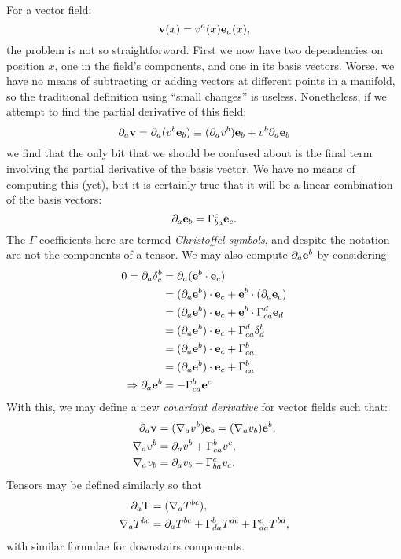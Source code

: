 For a vector field:
\begin{equation}
 \mathbf{v}(x) = v^a(x)\mathbf{e}_a(x),
  \label{eqn:dg:vector_field}
\end{equation}
the problem is not so straightforward. First we now have two dependencies on position $x$, one in the field's components, and one in its basis vectors. Worse, we have no means of subtracting or adding vectors at different points in a manifold, so the traditional definition using ``small changes'' is useless. Nonetheless, if we attempt to find the partial derivative of this field:
\begin{equation}
  \partial_a\mathbf{v} = \partial_a(v^b\mathbf{e}_b) \equiv (\partial_a v^b) \mathbf{e}_b + v^b \partial_a\mathbf{e}_b
  \label{eqn:dg:partial_expand}
\end{equation}
we find that the only bit that we should be confused about is the final term involving the partial derivative of the basis vector. We have no means of computing this (yet), but it is certainly true that it will be a linear combination of the basis vectors:
\begin{equation}
  \partial_a\mathbf{e}_b = \Gamma^c_{ba} \mathbf{e}_c.
  \label{eqn:dg:gamma_def}
\end{equation}
The $\Gamma$ coefficients here are termed {\em Christoffel symbols}, and despite the notation are not the components of a tensor. We may also compute $\partial_a \mathbf{e}^b$ by considering:
\begin{align}
  0 = \partial_a \delta^b_c &= \partial_a (\mathbf{e}^b\cdot\mathbf{e}_c)  
  \nonumber\\
  &= (\partial_a\mathbf{e}^b)\cdot\mathbf{e}_c + \mathbf{e}^b\cdot(\partial_a\mathbf{e}_c)
  \nonumber \\
  &= (\partial_a\mathbf{e}^b)\cdot\mathbf{e}_c + \mathbf{e}^b\cdot\Gamma^d_{ca} \mathbf{e}_d 
  \nonumber \\
  &= (\partial_a\mathbf{e}^b)\cdot\mathbf{e}_c + \Gamma^d_{ca} \delta^b_d
  \nonumber \\
  &= (\partial_a\mathbf{e}^b)\cdot\mathbf{e}_c + \Gamma^b_{ca} 
  \nonumber \\
  &= (\partial_a\mathbf{e}^b)\cdot\mathbf{e}_c + \Gamma^b_{ca} 
  \nonumber \\
  \Rightarrow \partial_a\mathbf{e}^b
  &=  - \Gamma^b_{ca} \mathbf{e}^c
  \label{eqn:dg:chris_deriv}
\end{align}
With this, we may define a new {\em covariant derivative\/} for vector fields such that:
\begin{align}
  \partial_a\mathbf{v} &= (\nabla_a v^b) \mathbf{e}_b = (\nabla_a v_b) \mathbf{e}^b,
  \\
   \nabla_a v^b &= \partial_a v^b + \Gamma^b_{ca}v^c,
   \\
   \nabla_a v_b &= \partial_a v_b - \Gamma^c_{ba}v_c.
\end{align}
Tensors may be defined similarly so that
\begin{align}
  \partial_a \mathrm{T} &= (\nabla_a T^{bc}),
  \\
  \nabla_a T^{bc} &= \partial_a T^{bc} + \Gamma^b_{da}T^{dc} + \Gamma^c_{da}T^{bd},
\end{align}
with similar formulae for downstairs components.

